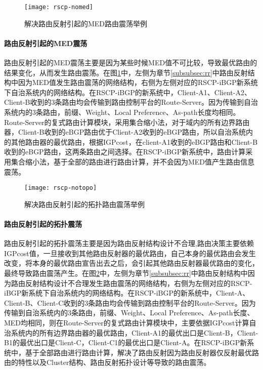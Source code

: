 \begin{figure}
  \centering
  \texttt{[image: rscp-nomed]}
  \caption{解决路由反射引起的MED路由震荡举例}
  \label{fig:rscp-nomed}
\end{figure}


\paragraph{路由反射引起的MED震荡}

路由反射引起的MED震荡主要是因为某些时候MED值不可比较，导致最优路由的结果变化，从而发生路由震荡。在图\ref{fig:rscp-nomed}中，左侧为章节\ref{subsubsec:rr}中路由反射结构中因为MED值发生路由震荡的网络结构，右侧为左侧对应的RSCP-iBGP新系统下自治系统内的网络结构。在RSCP-iBGP的新系统中，Client-A1、Client-A2、Client-B收到的3条路由均会传输到路由控制平台的Route-Server。因为传输到自治系统内的3条路由，前缀、Weight、Local Preference、As-path长度均相同。Route-Server的复式路由计算模块，采用集合缩小法，对于域内的所有边界路由器，Client-B收到的eBGP路由优于Client-A2收到的eBGP路由，所以自治系统内的其他路由器的最优路由，根据IGPcost，在client-A1收到的eBGP路由和Client-B收到的eBGP路由，这两条路由之间选择。在RSCP-iBGP新系统中，路由计算采用集合缩小法，基于全部的路由进行路由计算，并不会因为MED值产生路由信息震荡。\\


\begin{figure}
  \centering
  \texttt{[image: rscp-notopo]}
  \caption{解决路由反射引起的拓扑路由震荡举例}
  \label{fig:rscp-notopo}
\end{figure}

\paragraph{路由反射引起的拓扑震荡}

路由反射引起的拓扑震荡主要是因为路由反射结构设计不合理,路由决策主要依赖IGPcost值，一旦接收到其他路由反射器的最优路由，自己本身的最优路由会发生改变，将本身的最优路由宣告出去之后，会引起其他路由反射器最优路由的变化，最终导致路由震荡产生。在图\ref{fig:rscp-notopo}中，左侧为章节\ref{subsubsec:rr}中路由反射结构中因为路由反射结构设计不合理发生路由震荡的网络结构，右侧为左侧对应的RSCP-iBGP新系统下自治系统内的网络结构。在RSCP-iBGP的新系统中，Client-A、Client-B、Client-C收到的3条路由均会传输到路由控制平台的Route-Server。因为传输到自治系统内的3条路由，前缀、Weight、Local Preference、As-path长度、MED均相同，则在Route-Server的复式路由计算模块中，主要依据IGPcost计算自治系统内的所有边界路由器的最优路由，Client-A1的最优出口是Client-B，Client-B1的最优出口是Client-C，Client-C1的最优出口是Client-A。在RSCP-iBGP新系统中，基于全部路由进行路由计算，解决了路由反射因为路由反射器仅反射最优路由的特性以及Cluster结构、路由反射拓扑设计等导致的路由震荡。

